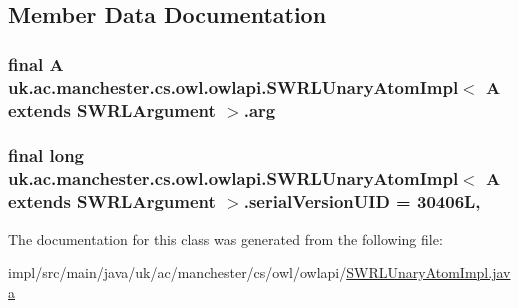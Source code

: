 \subsection{Member Data Documentation}
\hypertarget{classuk_1_1ac_1_1manchester_1_1cs_1_1owl_1_1owlapi_1_1_s_w_r_l_unary_atom_impl_3_01_a_01extends_01_s_w_r_l_argument_01_4_a5fe8279ab169b4c8984ed60d059d6ca4}{
\subsubsection[{arg}]{\setlength{\rightskip}{0pt plus 5cm}final A uk.\-ac.\-manchester.\-cs.\-owl.\-owlapi.\-S\-W\-R\-L\-Unary\-Atom\-Impl$<$ A extends {\bf S\-W\-R\-L\-Argument} $>$.arg\hspace{0.3cm}{\ttfamily [private]}}}\label{classuk_1_1ac_1_1manchester_1_1cs_1_1owl_1_1owlapi_1_1_s_w_r_l_unary_atom_impl_3_01_a_01extends_01_s_w_r_l_argument_01_4_a5fe8279ab169b4c8984ed60d059d6ca4}
\hypertarget{classuk_1_1ac_1_1manchester_1_1cs_1_1owl_1_1owlapi_1_1_s_w_r_l_unary_atom_impl_3_01_a_01extends_01_s_w_r_l_argument_01_4_a988bd61bdb34fa7a04bbed4b82380123}{
\subsubsection[{serial\-Version\-U\-I\-D}]{\setlength{\rightskip}{0pt plus 5cm}final long uk.\-ac.\-manchester.\-cs.\-owl.\-owlapi.\-S\-W\-R\-L\-Unary\-Atom\-Impl$<$ A extends {\bf S\-W\-R\-L\-Argument} $>$.serial\-Version\-U\-I\-D = 30406\-L\hspace{0.3cm}{\ttfamily [static]}, {\ttfamily [private]}}}\label{classuk_1_1ac_1_1manchester_1_1cs_1_1owl_1_1owlapi_1_1_s_w_r_l_unary_atom_impl_3_01_a_01extends_01_s_w_r_l_argument_01_4_a988bd61bdb34fa7a04bbed4b82380123}


The documentation for this class was generated from the following file\-:\begin{DoxyCompactItemize}
\item 
impl/src/main/java/uk/ac/manchester/cs/owl/owlapi/\hyperlink{_s_w_r_l_unary_atom_impl_8java}{S\-W\-R\-L\-Unary\-Atom\-Impl.\-java}\end{DoxyCompactItemize}
